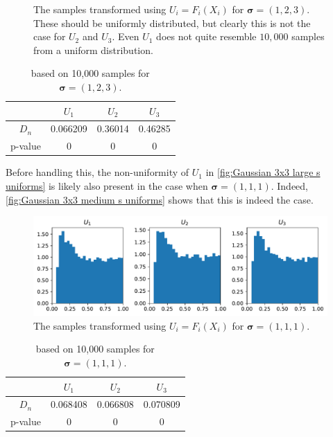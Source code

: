 \documentclass[../Thesis.tex]{subfiles}
\begin{document}
\begin{example}
\begin{figure}[H]
        \caption{The samples transformed using $U_i = F_i(X_i)$ for $\boldsymbol\sigma = (1,2,3)$. These should be uniformly distributed, but clearly this is not the case for $U_2$ and $U_3$. Even $U_1$ does not quite resemble $10{,}000$ samples from a uniform distribution.}
        \label{fig:Gaussian 3x3 large s uniforms}
    \end{figure}
    \begin{table}[h]
        \centering
        \begin{tabular}{c|c|c|c}
                    & $U_1$    & $U_2$   & $U_3$   \\\hline
            $D_n$   & 0.066209 & 0.36014 & 0.46285 \\
            p-value & 0        & 0       & 0
        \end{tabular}
        \caption{based on 10,000 samples for $\boldsymbol\sigma = (1, 2, 3)$.}
    \end{table}
    Before handling this, the non-uniformity of $U_1$ in \autoref{fig:Gaussian 3x3 large s uniforms} is likely also present in the case when $\boldsymbol\sigma = (1,1,1)$. Indeed, \autoref{fig:Gaussian 3x3 medium s uniforms} shows that this is indeed the case.
    \begin{figure}[H]
        \centering
        \includegraphics[width=0.99\linewidth]{figures/ND examples/Gaussian 3x3 medium s uniforms.pdf}
        \caption{The samples transformed using $U_i = F_i(X_i)$ for $\boldsymbol\sigma = (1,1,1)$.}
        \label{fig:Gaussian 3x3 medium s uniforms}
    \end{figure}
    \begin{table}[h]
        \centering
        \begin{tabular}{c|c|c|c}
                    & $U_1$    & $U_2$    & $U_3$    \\\hline
            $D_n$   & 0.068408 & 0.066808 & 0.070809 \\
            p-value & 0        & 0        & 0
        \end{tabular}
        \caption{based on 10,000 samples for $\boldsymbol\sigma = (1, 1, 1)$.}

\end{table}
\end{example}
\end{document}
